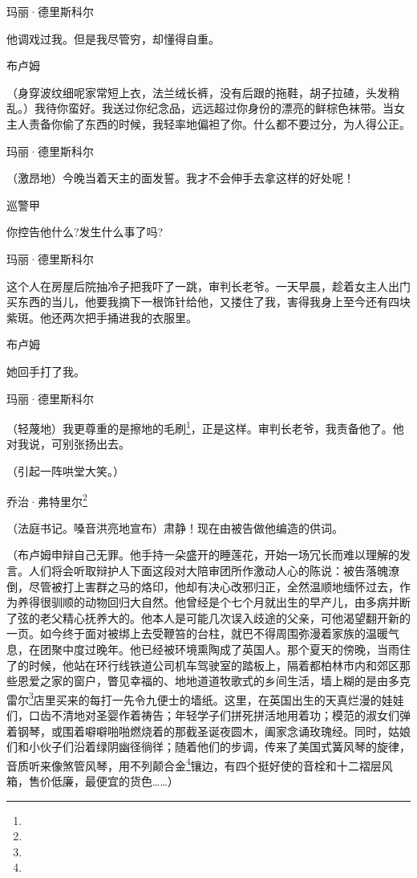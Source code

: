 \par 玛丽·德里斯科尔
\par 他调戏过我。但是我尽管穷，却懂得自重。
\par 布卢姆
\par （身穿波纹细呢家常短上衣，法兰绒长裤，没有后跟的拖鞋，胡子拉碴，头发稍乱。）我待你蛮好。我送过你纪念品，远远超过你身份的漂亮的鲜棕色袜带。当女主人责备你偷了东西的时候，我轻率地偏袒了你。什么都不要过分，为人得公正。
\par 玛丽·德里斯科尔
\par （激昂地）今晚当着天主的面发誓。我才不会伸手去拿这样的好处呢！
\par 巡警甲
\par 你控告他什么?发生什么事了吗?
\par 玛丽·德里斯科尔
\par 这个人在房屋后院抽冷子把我吓了一跳，审判长老爷。一天早晨，趁着女主人出门买东西的当儿，他要我摘下一根饰针给他，又搂住了我，害得我身上至今还有四块紫斑。他还两次把手捅进我的衣服里。
\par 布卢姆
\par 她回手打了我。
\par 玛丽·德里斯科尔
\par （轻蔑地）我更尊重的是擦地的毛刷\footnote{}，正是这样。审判长老爷，我责备他了。他对我说，可别张扬出去。
\par （引起一阵哄堂大笑。）
\par 乔治·弗特里尔\footnote{}
\par （法庭书记。嗓音洪亮地宣布）肃静！现在由被告做他编造的供词。
\par （布卢姆申辩自己无罪。他手持一朵盛开的睡莲花，开始一场冗长而难以理解的发言。人们将会听取辩护人下面这段对大陪审团所作激动人心的陈说：被告落魄潦倒，尽管被打上害群之马的烙印，他却有决心改邪归正，全然温顺地缅怀过去，作为养得很驯顺的动物回归大自然。他曾经是个七个月就出生的早产儿，由多病并断了弦的老父精心抚养大的。他本人是可能几次误入歧途的父亲，可他渴望翻开新的一页。如今终于面对被绑上去受鞭笞的台柱，就巴不得周围弥漫着家族的温暖气息，在团聚中度过晚年。他已经被环境熏陶成了英国人。那个夏天的傍晚，当雨住了的时候，他站在环行线铁道公司机车驾驶室的踏板上，隔着都柏林市内和郊区那些恩爱之家的窗户，瞥见幸福的、地地道道牧歌式的乡间生活，墙上糊的是由多克雷尔\footnote{}店里买来的每打一先令九便士的墙纸。这里，在英国出生的天真烂漫的娃娃们，口齿不清地对圣婴作着祷告；年轻学子们拼死拼活地用着功；模范的淑女们弹着钢琴，或围着噼噼啪啪燃烧着的那截圣诞夜圆木，阖家念诵玫瑰经。同时，姑娘们和小伙子们沿着绿阴幽径徜徉；随着他们的步调，传来了美国式簧风琴的旋律，音质听来像煞管风琴，用不列颠合金\footnote{}镶边，有四个挺好使的音栓和十二褶层风箱，售价低廉，最便宜的货色……）

